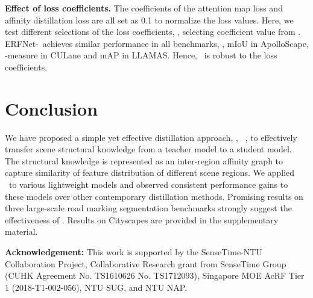 \documentclass[10pt,twocolumn,letterpaper]{article}
\begin{document}
\noindent \textbf{Effect of loss coefficients.} The coefficients of the attention map loss and affinity distillation loss are all set as 0.1 to normalize the loss values. Here, we test different selections of the loss coefficients, \ie, selecting coefficient value from . ERFNet-\algorithmname~achieves similar performance in all benchmarks, \ie,  mIoU in ApolloScape,  -measure in CULane and  mAP in LLAMAS. Hence, \algorithmname~is robust to the loss coefficients.     




 
\section{Conclusion}\label{conclusion}

We have proposed a simple yet effective distillation approach, \ie, \algorithmname~, to effectively transfer scene structural knowledge from a teacher model to a student model. The structural knowledge is represented as an inter-region affinity graph to capture similarity of feature distribution of different scene regions. We applied \algorithmname~to various lightweight models and observed consistent performance gains to these models over other contemporary distillation methods. Promising results on three large-scale road marking segmentation benchmarks strongly suggest the effectiveness of \algorithmname. Results on Cityscapes are provided in the supplementary material. 

\noindent \textbf{Acknowledgement:} This work is supported by the SenseTime-NTU Collaboration Project, Collaborative Research grant from SenseTime Group (CUHK Agreement No. TS1610626  No. TS1712093), Singapore MOE AcRF Tier 1 (2018-T1-002-056), NTU SUG, and NTU NAP.

{\small


}
\end{document}
